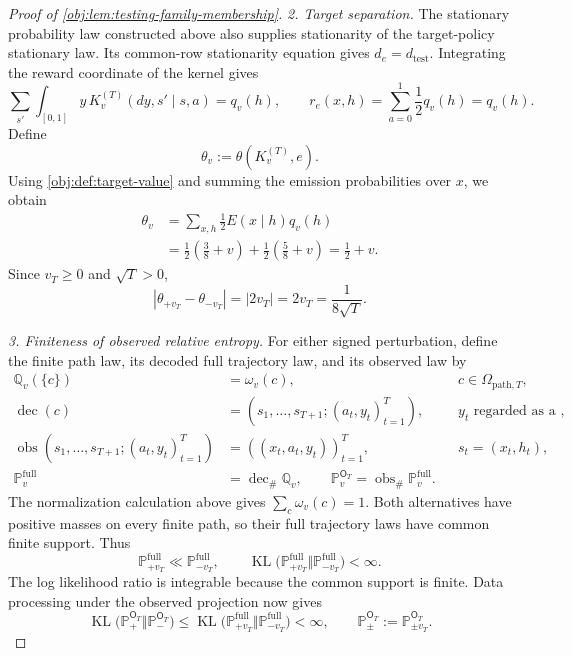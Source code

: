 \documentclass[11pt]{article}
\begin{document}
\begin{proof}[Proof of \cref{obj:lem:testing-family-membership}]
\emph{2. Target separation.}
The stationary probability law constructed above also supplies stationarity of the target-policy stationary law. Its common-row stationarity equation gives \(d_e=d_{\mathrm{test}}\). Integrating the reward coordinate of the kernel gives
\[
\sum_{s'}\int_{[0,1]}y\,K_v^{(T)}(dy,s'\mid s,a)
=q_v(h),
\qquad
r_e(x,h)=\sum_{a=0}^1\frac12q_v(h)=q_v(h).
\]
Define
\[
\theta_v:=\theta(K_v^{(T)},e).
\]
Using \cref{obj:def:target-value} and summing the emission probabilities over \(x\), we obtain
\[
\begin{aligned}
\theta_v
&=\sum_{x,h}\frac12E(x\mid h)q_v(h)\\
&=\frac12\left(\frac38+v\right)
 +\frac12\left(\frac58+v\right)
=\frac12+v.
\end{aligned}
\]
Since \(v_T\geq0\) and \(\sqrt T>0\),
\[
|\theta_{+v_T}-\theta_{-v_T}|
=|2v_T|
=2v_T
=\frac1{8\sqrt T}.
\]

\emph{3. Finiteness of observed relative entropy.}
For either signed perturbation, define the finite path law, its decoded full trajectory law, and its observed law by
\[
\begin{aligned}
\mathbb Q_v(\{c\})&=\omega_v(c),
&&c\in\Omega_{\mathrm{path},T},\\
\operatorname{dec}(c)
&=(s_1,\ldots,s_{T+1};(a_t,y_t)_{t=1}^T),
&&y_t\text{ regarded as a real reward},\\
\operatorname{obs}
  (s_1,\ldots,s_{T+1};(a_t,y_t)_{t=1}^T)
&=((x_t,a_t,y_t))_{t=1}^T,
&&s_t=(x_t,h_t),\\
\mathbb P_v^{\mathrm{full}}
&=\operatorname{dec}_{\#}\mathbb Q_v,
\qquad
\mathbb P_v^{\mathsf O_T}
=\operatorname{obs}_{\#}\mathbb P_v^{\mathrm{full}}.
\end{aligned}
\]
The normalization calculation above gives
\(\sum_c\omega_v(c)=1\). Both alternatives have positive masses on every finite path, so their full trajectory laws have common finite support. Thus
\[
\mathbb P_{+v_T}^{\mathrm{full}}
\ll\mathbb P_{-v_T}^{\mathrm{full}},
\qquad
\operatorname{KL}
 \bigl(\mathbb P_{+v_T}^{\mathrm{full}}
       \Vert\mathbb P_{-v_T}^{\mathrm{full}}\bigr)<\infty.
\]
The log likelihood ratio is integrable because the common support is finite. Data processing under the observed projection now gives
\[
\operatorname{KL}
 \bigl(\mathbb P_{+}^{\mathsf O_T}
       \Vert\mathbb P_{-}^{\mathsf O_T}\bigr)
\leq
\operatorname{KL}
 \bigl(\mathbb P_{+v_T}^{\mathrm{full}}
       \Vert\mathbb P_{-v_T}^{\mathrm{full}}\bigr)
<\infty,
\qquad
\mathbb P_\pm^{\mathsf O_T}
:=\mathbb P_{\pm v_T}^{\mathsf O_T}.
\]


\end{proof}
\end{document}
